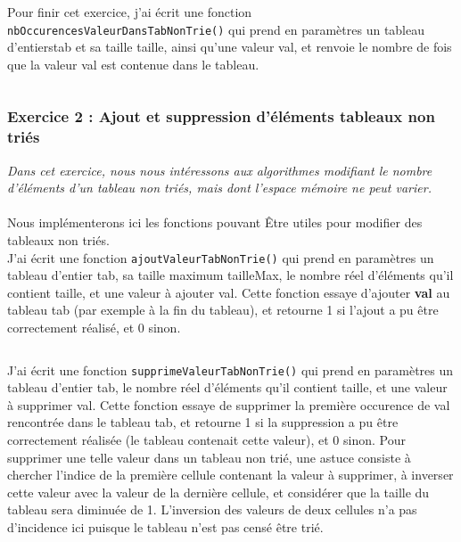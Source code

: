 Pour finir cet exercice, j'ai écrit une fonction \texttt{nbOccurencesValeurDansTabNonTrie()} qui prend en paramètres un tableau d’entierstab et sa taille taille, ainsi qu’une valeur val, et renvoie le nombre de fois que la valeur val est contenue dans le tableau.
\inputminted[linenos,firstline=30,lastline=37]{cpp}{../sources/cpp/TP1-2/manipTableauxNonTries.c}

\subsubsection{Exercice 2 : Ajout et suppression d'éléments tableaux non triés}
\textit{Dans cet exercice, nous nous intéressons aux algorithmes modifiant le nombre d’éléments d’un tableau non triés, mais dont l’espace mémoire ne peut varier.}
\\\\
Nous implémenterons ici les fonctions pouvant Être utiles pour modifier des tableaux non triés.\\

J'ai écrit une fonction \texttt{ajoutValeurTabNonTrie()} qui prend en paramètres un tableau d’entier tab, sa taille maximum tailleMax, le nombre réel d’éléments qu’il contient taille, et une valeur à ajouter val. Cette fonction essaye d’ajouter \textbf{val} au tableau tab (par exemple à la fin du tableau), et retourne 1 si l’ajout a pu être correctement réalisé, et 0 sinon.
\inputminted[linenos,firstline=7,lastline=13]{cpp}{../sources/cpp/TP1-2/modifTableauxNonTries.c}

J'ai écrit une fonction \texttt{supprimeValeurTabNonTrie()} qui prend en paramètres un tableau d’entier tab, le nombre réel d’éléments qu’il contient taille, et une valeur à supprimer val. Cette fonction essaye de supprimer la première occurence de val rencontrée dans le tableau tab, et retourne 1 si la suppression a pu être correctement réalisée (le tableau contenait cette valeur), et 0 sinon. Pour supprimer une telle valeur dans un tableau non trié, une astuce consiste à chercher l’indice de la première cellule contenant la valeur à supprimer, à inverser cette valeur avec la valeur de la dernière cellule, et considérer que la taille du tableau sera diminuée de 1. L’inversion des valeurs de deux cellules n’a pas d’incidence ici puisque le tableau n’est pas censé être trié.
\inputminted[linenos,firstline=15,lastline=27]{cpp}{../sources/cpp/TP1-2/modifTableauxNonTries.c}

